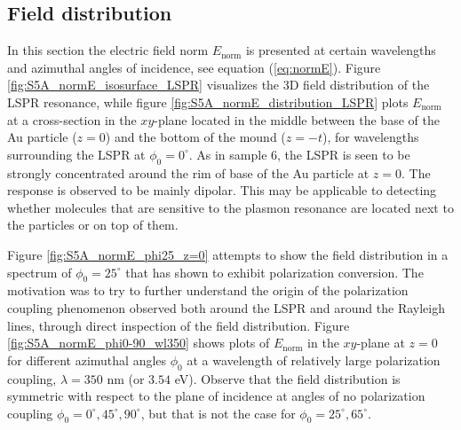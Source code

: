 \subsection{Field distribution}
In this section the electric field norm $E_\text{norm}$ is presented at certain wavelengths and azimuthal angles of incidence, see equation (\ref{eq:normE}). Figure \ref{fig:S5A_normE_isosurface_LSPR} visualizes the 3D field distribution of the LSPR resonance, while figure \ref{fig:S5A_normE_distribution_LSPR} plots $E_\text{norm}$ at a cross-section in the $xy$-plane located in the middle between the base of the Au particle ($z=0$) and the bottom of the mound ($z=-t$), for wavelengths surrounding the LSPR at $\phi_0=0^\circ$. As in sample 6, the LSPR is seen to be strongly concentrated around the rim of base of the Au particle at $z=0$. The response is observed to be mainly dipolar. This may be applicable to detecting whether molecules that are sensitive to the plasmon resonance are located next to the particles or on top of them.

Figure \ref{fig:S5A_normE_phi25_z=0} attempts to show the field distribution in a spectrum of $\phi_0=25^\circ$ that has shown to exhibit polarization conversion. The motivation was to try to further understand the origin of the polarization coupling phenomenon observed both around the LSPR and around the Rayleigh lines, through direct inspection of the field distribution. Figure \ref{fig:S5A_normE_phi0-90_wl350} shows plots of $E_\text{norm}$ in the $xy$-plane at $z=0$ for different azimuthal angles $\phi_0$ at a wavelength of relatively large polarization coupling, $\lambda=350$ nm (or $3.54$ eV). Observe that the field distribution is symmetric with respect to the plane of incidence at angles of no polarization coupling $\phi_0=0^\circ, 45^\circ, 90^\circ$, but that is not the case for $\phi_0=25^\circ, 65^\circ$.


